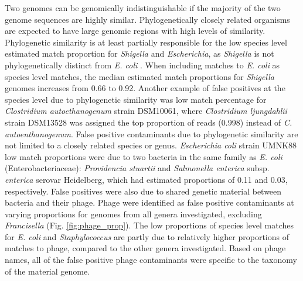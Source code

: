 \documentclass[fleqn,10pt,lineno]{wlpeerj}\usepackage[]{graphicx}\usepackage[]{color}
\begin{document}
Two genomes can be genomically indistinguishable if the majority of the two genome sequences are highly similar.
Phylogenetically closely related organisms are expected to have large genomic regions with high levels of similarity.
Phylogenetic similarity is at least partially responsible for the low species level estimated match proportion for  \textit{Shigella} and \textit{Escherichia}, as \textit{Shigella} is not phylogenetically distinct from \textit{E. coli} \citep{lan2002escherichia}.
When including matches to \textit{E. coli} as species level matches, the median estimated match proportions for \textit{Shigella} genomes increases from 0.66 to 0.92.
Another example of false positives at the species level due to phylogenetic similarity was low match percentage for \textit{Clostridium autoethanogenum} strain DSM10061, where \textit{Clostridium ljungdahlii} strain DSM13528 was assigned the top proportion of reads (0.998) instead of \textit{C. autoenthanogenum}.
False positive contaminants due to phylogenetic similarity are not limited to a closely related species or genus.
\textit{Escherichia coli} strain UMNK88 low match proportions were due to two bacteria in the same family as \textit{E. coli}
(Enterobacteriaceae): \textit{Providencia stuartii} and \textit{Salmonella enterica} subsp. \textit{enterica} serovar Heidelberg, which had estimated proportions of 0.11 and 0.03, respectively.
False positives were also due to shared genetic material between bacteria and their phage.
Phage were identified as false positive contaminants at varying proportions for genomes from all genera investigated, excluding \textit{Francisella} (Fig. \ref{fig:phage_prop}).
The low proportions of species level matches for \textit{E. coli} and \textit{Staphylococcus} are partly due to relatively higher proportions of matches to phage, compared to the other genera investigated.
Based on phage names, all of the false positive phage contaminants were specific to the taxonomy of the material genome.
\end{document}
